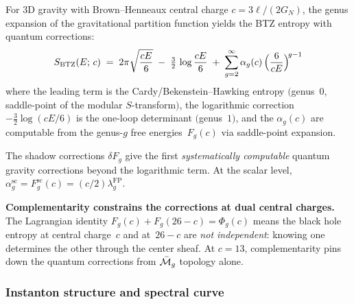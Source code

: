 \begin{remark}%
\label{rem:quantum-bh-entropy}%
%
For 3D gravity with Brown--Henneaux central charge
$c = 3\ell/(2G_N)$, the genus expansion of the
gravitational partition function yields the BTZ entropy
with quantum corrections:
\begin{equation}\label{eq:btz-entropy-expansion}
S_{\mathrm{BTZ}}(E;\,c)
\;=\;
2\pi\sqrt{\frac{cE}{6}}
\;-\;
\tfrac{3}{2}\,\log\frac{cE}{6}
\;+\;
\sum_{g=2}^{\infty}
\alpha_g(c)\,
\Bigl(\frac{6}{cE}\Bigr)^{\!g-1}
\end{equation}
where the leading term is the Cardy/Bekenstein--Hawking
entropy $($genus~$0$, saddle-point of the modular
$S$-transform$)$, the logarithmic correction
$-\tfrac{3}{2}\log(cE/6)$ is the one-loop
determinant $($genus~$1)$, and the $\alpha_g(c)$ are
computable from the genus-$g$ free energies~$F_g(c)$
via saddle-point expansion.

The shadow corrections $\delta F_g$ give the
first \emph{systematically computable} quantum gravity
corrections beyond the logarithmic term.
At the scalar level,
$\alpha_g^{\mathrm{sc}} = F_g^{\mathrm{sc}}(c)
= (c/2)\lambda_g^{\mathrm{FP}}$.

\textbf{Complementarity constrains the corrections
at dual central charges.}
The Lagrangian identity
$F_g(c) + F_g(26-c) = \Phi_g(c)$ means the
black hole entropy at central charge~$c$ and at~$26-c$
are \emph{not independent}: knowing one determines
the other through the center sheaf.
At $c = 13$, complementarity pins down the quantum
corrections from $\bar{\mathcal{M}}_g$ topology alone.
\end{remark}

\subsubsection{Instanton structure and spectral curve}
\label{subsubsec:instanton-spectral}

